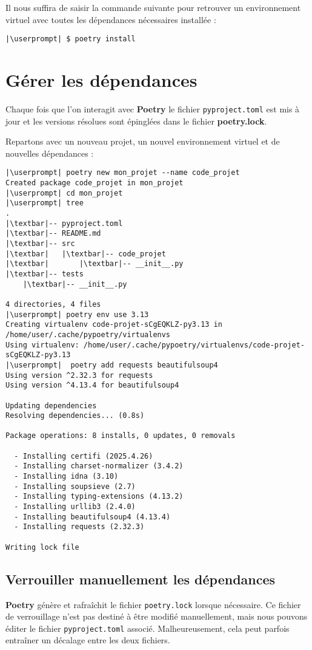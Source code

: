 Il nous suffira de saisir la commande suivante pour retrouver un environnement virtuel avec toutes les dépendances nécessaires installée :
\begin{lstlisting}[style=bash]
|\userprompt| $ poetry install
\end{lstlisting}

\section{Gérer les dépendances}
Chaque fois que l'on interagit avec \textbf{Poetry} le fichier \texttt{pyproject.toml} est mis à jour et les versions résolues sont épinglées dans le fichier \textbf{poetry.lock}.

Repartons avec un nouveau projet, un nouvel environnement virtuel et de nouvelles dépendances :
\begin{lstlisting}[style=bash]
|\userprompt| poetry new mon_projet --name code_projet
Created package code_projet in mon_projet
|\userprompt| cd mon_projet
|\userprompt| tree
.
|\textbar|-- pyproject.toml
|\textbar|-- README.md
|\textbar|-- src
|\textbar|   |\textbar|-- code_projet
|\textbar|       |\textbar|-- __init__.py
|\textbar|-- tests
    |\textbar|-- __init__.py

4 directories, 4 files
|\userprompt| poetry env use 3.13
Creating virtualenv code-projet-sCgEQKLZ-py3.13 in /home/user/.cache/pypoetry/virtualenvs
Using virtualenv: /home/user/.cache/pypoetry/virtualenvs/code-projet-sCgEQKLZ-py3.13
|\userprompt|  poetry add requests beautifulsoup4
Using version ^2.32.3 for requests
Using version ^4.13.4 for beautifulsoup4

Updating dependencies
Resolving dependencies... (0.8s)

Package operations: 8 installs, 0 updates, 0 removals

  - Installing certifi (2025.4.26)
  - Installing charset-normalizer (3.4.2)
  - Installing idna (3.10)
  - Installing soupsieve (2.7)
  - Installing typing-extensions (4.13.2)
  - Installing urllib3 (2.4.0)
  - Installing beautifulsoup4 (4.13.4)
  - Installing requests (2.32.3)

Writing lock file
\end{lstlisting}

\subsection*{Verrouiller manuellement les dépendances}
\textbf{Poetry} génère et rafraîchit le fichier \texttt{poetry.lock} lorsque nécessaire. Ce fichier de verrouillage n'est pas destiné à être modifié manuellement, mais nous pouvons éditer le fichier \texttt{pyproject.toml} associé. Malheureusement, cela peut parfois entraîner un décalage entre les deux fichiers.

